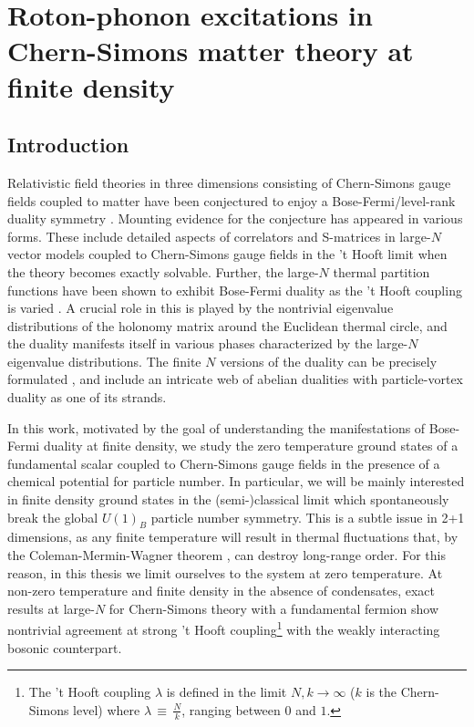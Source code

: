 \chapter{Roton-phonon excitations in Chern-Simons matter theory at finite density}
\label{ch:Chapter_3}
    \graphicspath{{Chapter_3_Folder/figures/PNG/}{Chapter_3_Folder/figures/PDF/}{Chapter_3_Folder/figures/}}

\section{Introduction}
Relativistic field theories in three dimensions consisting of Chern-Simons gauge fields coupled to matter have been conjectured to enjoy a Bose-Fermi/level-rank duality symmetry \cite{Giombi:2011kc}. Mounting evidence for the conjecture has appeared in various forms. These include detailed aspects of  correlators \cite{Giombi:2011kc, Aharony:2011jz, Maldacena:2011jn, Maldacena:2012sf, Aharony:2012nh} and S-matrices \cite{Jain:2014nza, Dandekar:2014era} in large-$N$ vector models coupled to Chern-Simons gauge fields in the 't Hooft limit when the theory  becomes exactly solvable. 
Further, the large-$N$ thermal partition functions have been shown to exhibit Bose-Fermi duality as the 't Hooft coupling is varied \cite{Giombi:2011kc, Aharony:2012ns,Jain:2013py, Jain:2013gza, Takimi:2013zca}.  A crucial role in this is played by the nontrivial eigenvalue distributions of the holonomy matrix around the Euclidean thermal circle, and the duality manifests itself in various phases characterized by the large-$N$ eigenvalue distributions. The  finite $N$ versions of the duality can be precisely formulated \cite{Aharony:2015mjs}, and include an intricate web of abelian dualities \cite{Seiberg:2016gmd, Karch:2016sxi, Murugan:2016zal} with particle-vortex duality as one of its strands.

 In this work, motivated by the goal of understanding the manifestations of Bose-Fermi duality at finite density, we  study the zero temperature ground states of a fundamental scalar coupled to Chern-Simons gauge fields in the presence of a chemical potential for particle number. In particular, we will be mainly interested in finite density ground states in the (semi-)classical limit which spontaneously break the global $U(1)_B$ particle number symmetry. This is a subtle issue in 2+1 dimensions, as any finite temperature will result in thermal fluctuations that, by the Coleman-Mermin-Wagner theorem \cite{Coleman:1973ci, Mermin:1966fe}, can  destroy long-range order. 
 For this reason, in this thesis we limit ourselves to the system at zero temperature. 
 At  non-zero temperature and finite density in the absence of condensates,  exact results at large-$N$ for Chern-Simons theory with a fundamental fermion \cite{Geracie:2015drf, Gur-Ari:2016xff} show nontrivial agreement at strong 't Hooft coupling\footnote{The 't Hooft coupling $\lambda$ is defined in the limit $N,k\to\infty$  ($k$ is the Chern-Simons level) where $\lambda \,\equiv\,\frac{N}{k}$, ranging between $0$ and $1$. } with the weakly interacting bosonic counterpart.
 
